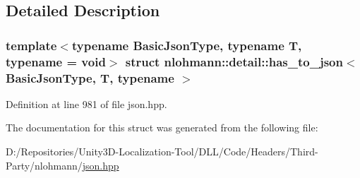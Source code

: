 \subsection{Detailed Description}
\subsubsection*{template$<$typename Basic\+Json\+Type, typename T, typename = void$>$\newline
struct nlohmann\+::detail\+::has\+\_\+to\+\_\+json$<$ Basic\+Json\+Type, T, typename $>$}



Definition at line 981 of file json.\+hpp.



The documentation for this struct was generated from the following file\+:\begin{DoxyCompactItemize}
\item 
D\+:/\+Repositories/\+Unity3\+D-\/\+Localization-\/\+Tool/\+D\+L\+L/\+Code/\+Headers/\+Third-\/\+Party/nlohmann/\mbox{\hyperlink{json_8hpp}{json.\+hpp}}\end{DoxyCompactItemize}
